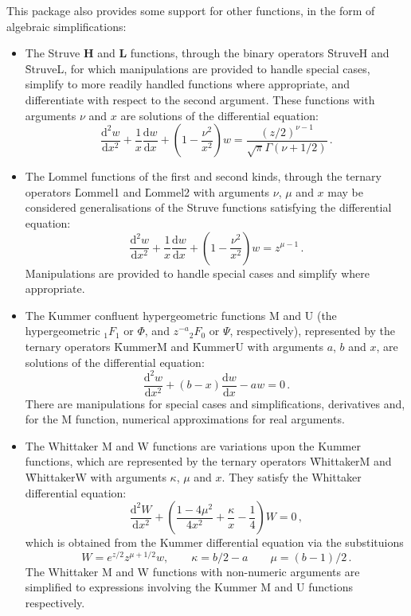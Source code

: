 This package also provides some support for other functions, in the form
of algebraic simplifications:
\begin{itemize}
\item The Struve \textbf{H} and \textbf{L} functions, through the binary
operators \f{StruveH} and \f{StruveL}, for which manipulations are
provided to handle special cases, simplify to more readily handled
functions where appropriate, and differentiate with respect to the second
argument. These functions with arguments $\nu$ and $x$ are solutions of the
differential equation:
\[\frac{\mathrm{d}^2w}{\mathrm{d}x^2}+\frac{1}{x}\frac{\mathrm{d}w}{\mathrm{d}x}
+\left(1-\frac{\nu^2}{x^2}\right)w
= \frac{(z/2)^{\nu-1}}{\sqrt{\pi}\Gamma(\nu+1/2)}\,.\]
\item The Lommel functions of the first and second kinds, through the
ternary operators \f{Lommel1} and \f{Lommel2} with arguments $\nu$, $\mu$
and $x$ may be considered generalisations of the Struve functions satisfying
the differential equation:
\[\frac{\mathrm{d}^2w}{\mathrm{d}x^2}+\frac{1}{x}\frac{\mathrm{d}w}{\mathrm{d}x}
+\left(1-\frac{\nu^2}{x^2}\right)w = z^{\mu-1}\,.\]
Manipulations are provided to handle special cases and simplify where
appropriate.
\item The Kummer confluent hypergeometric functions M and U (the
hypergeometric ${_1F_1}$ or $\Phi$, and $z^{-a}{_2F_0}$ or $\Psi$,
respectively), represented by the ternary operators \f{KummerM} and \f{KummerU} with
arguments $a$, $b$ and $x$, are solutions of the differential equation:
\[\frac{\mathrm{d}^2w}{\mathrm{d}x^2}+(b-x)\frac{\mathrm{d} w}{\mathrm{d}x}
-a w = 0\,.\]
There are manipulations for special cases and simplifications, derivatives
and, for the M function, numerical approximations for real arguments.
\item The Whittaker M and W functions are variations upon the Kummer
functions, which are represented by the ternary operators \f{WhittakerM} and
\f{WhittakerW} with arguments $\kappa$, $\mu$ and $x$.
They satisfy the Whittaker differential equation:
\[\frac{\mathrm{d}^2W}{\mathrm{d}x^2}+\left(\frac{1-4\mu^2}{4x^2}+
\frac{\kappa}{x} -\frac{1}{4}\right)W =0\,,\]
which is obtained from the Kummer differential equation via the substituions
\[W=e^{z/2}z^{\mu+1/2} w,\qquad \kappa=b/2-a\qquad \mu =(b-1)/2\,.\]
The Whittaker M and W functions with non-numeric arguments are simplified to
expressions involving the Kummer M and U functions respectively.
\end{itemize}

